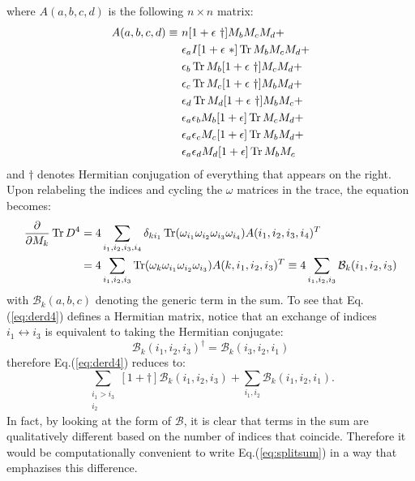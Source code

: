 \documentclass[12pt,a4paper]{article}
\DeclareMathOperator{\Tr}{Tr}
\begin{document}
where $A(a, b, c, d )$ is the following $n \times n$ matrix:
\begin{align}
A(a,b,c,d) \equiv \ &n [1+\epsilon \ \dagger] M_b M_c M_d + \notag \\
&\epsilon_a I [1 + \epsilon \ *] \Tr M_b M_c M_d  + \notag \\
&\epsilon_b \Tr M_b [1 + \epsilon \ \dagger] M_c M_d + \notag \\
&\epsilon_c \Tr M_c [1 + \epsilon \ \dagger] M_b M_d + \notag \\
&\epsilon_d \Tr M_d [1 + \epsilon \ \dagger] M_b M_c + \notag \\
&\epsilon_a \epsilon_b M_b [1 + \epsilon] \Tr M_c M_d + \notag \\
&\epsilon_a \epsilon_c M_c [1 + \epsilon] \Tr M_b M_d + \notag \\
&\epsilon_a \epsilon_d M_d [1 + \epsilon] \Tr M_b M_c
\end{align}
and $\dagger$ denotes Hermitian conjugation of everything that appears on the right. Upon relabeling the indices and cycling the $\omega$ matrices in the trace, the equation becomes:
\begin{align}\label{eq:derd4}
\frac{\partial}{\partial M_k} \Tr D^4 &= 4 \sum_{i_1, i_2, i_3, i_4} \delta_{ki_1} \Tr (\omega_{i_1} \omega_{i_2} \omega_{i_3} \omega_{i_4}) A(i_1, i_2, i_3, i_4)^T \notag \\
&= 4 \sum_{i_1, i_2, i_3} \Tr (\omega_{k} \omega_{i_1} \omega_{i_2} \omega_{i_3}) A(k, i_1, i_2, i_3)^T \equiv 4 \sum_{i_1, i_2, i_3} \mathcal{B}_k(i_1, i_2, i_3)
\end{align}
with $\mathcal{B}_k(a, b, c)$ denoting the generic term in the sum.\newline
To see that Eq.(\ref{eq:derd4}) defines a Hermitian matrix, notice that an exchange of indices $i_1 \leftrightarrow i_3$ is equivalent to taking the Hermitian conjugate:
\begin{equation}\label{eq:BBd}
\mathcal{B}_k(i_1, i_2, i_3)^{\dagger} = \mathcal{B}_k(i_3, i_2, i_1)
\end{equation}
therefore Eq.(\ref{eq:derd4}) reduces to:
\begin{equation}\label{eq:splitsum}
\sum_{\substack{i_1 > i_3 \\ i_2}} [1+\dagger] \mathcal{B}_k(i_1, i_2, i_3) + \sum_{i_1, i_2} \mathcal{B}_k(i_1, i_2, i_1).
\end{equation}
In fact, by looking at the form of $\mathcal{B}$, it is clear that terms in the sum are qualitatively different based on the number of indices that coincide. Therefore it would be computationally convenient to write Eq.(\ref{eq:splitsum}) in a way that emphazises this difference.\newline
\end{document}
